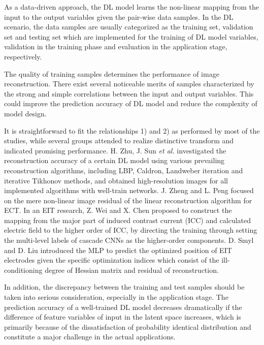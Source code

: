 As a data-driven approach, the DL model learns the non-linear mapping from the input to the output variables given the pair-wise data samples.
In the DL scenario, the data samples are usually categorized as the training set, validation set and testing set which are implemented for the training of DL model variables, validation in the training phase and evaluation in the application stage, respectively.

The quality of training samples determines the performance of image reconstruction.
There exist several noticeable merits of samples characterized by the strong and simple correlations between the input and output variables. This could improve the prediction accuracy of DL model and reduce the complexity of model design.

It is straightforward to fit the relationships 1) and 2) as performed by most of the studies, while several groups attended to realize distinctive transform and indicated promising performance.
H. Zhu, J. Sun \emph{et al.} \cite{Zhu2021Deep} investigated the reconstruction accuracy of a certain DL model using various prevailing reconstruction algorithms, including LBP, Caldron, Landweber iteration and iterative Tikhonov methods, and obtained high-resolution images for all implemented algorithms with well-train networks.
J. Zheng and L. Peng\cite{Zheng2020ADeep} focused on the mere non-linear image residual of the linear reconstruction algorithm for ECT.
In an EIT research, Z. Wei and X. Chen \cite{Wei2020Induced} proposed to construct the mapping from the major part of induced contrast current (ICC) and calculated electric field to the higher order of ICC, by directing the training through setting the multi-level labels of cascade CNNs as the higher-order components.
D. Smyl and D. Liu \cite{Smyl2020Optimizing} introduced the MLP to predict the optimized position of EIT electrodes given the specific optimization indices which consist of the ill-conditioning degree of Hessian matrix and residual of reconstruction.

In addition, the discrepancy between the training and test samples should be taken into serious consideration, especially in the application stage.
The prediction accuracy of a well-trained DL model decreases dramatically if the difference of feature variables of input in the latent space increases, which is primarily because of the dissatisfaction of probability identical distribution and constitute a major challenge in the actual applications\cite{Hampe2020Investigating}.

